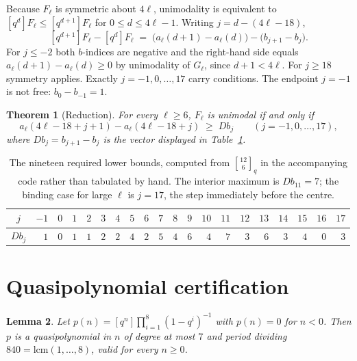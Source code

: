 \documentclass[11pt]{article}
\newtheorem{theorem}{Theorem}
\newtheorem{lemma}[theorem]{Lemma}
\theoremstyle{definition}
\newcommand{\gauss}[2]{\genfrac{[}{]}{0pt}{0}{#1}{#2}_q}
\newcommand{\coeff}[1]{[q^{#1}]}
\begin{document}
Because $F_\ell$ is symmetric about $4\ell$, unimodality is equivalent to
$\coeff{d}F_\ell\le\coeff{d+1}F_\ell$ for $0\le d\le 4\ell-1$. Writing $j=d-(4\ell-18)$,
\[
  \coeff{d+1}F_\ell-\coeff{d}F_\ell
  \;=\;\bigl(a_\ell(d+1)-a_\ell(d)\bigr)-\bigl(b_{j+1}-b_j\bigr).
\]
For $j\le-2$ both $b$-indices are negative and the right-hand side equals
$a_\ell(d+1)-a_\ell(d)\ge0$ by unimodality of $G_\ell$, since $d+1<4\ell$. For $j\ge18$ symmetry
applies. Exactly $j=-1,0,\dots,17$ carry conditions. The endpoint $j=-1$ is not free:
$b_0-b_{-1}=1$.

\begin{theorem}[Reduction]\label{thm:reduction}
For every $\ell\ge6$, $F_\ell$ is unimodal if and only if
\[
  a_\ell(4\ell-18+j+1)-a_\ell(4\ell-18+j)\;\ge\; D b_j
  \qquad (j=-1,0,\dots,17),
\]
where $D b_j=b_{j+1}-b_j$ is the vector displayed in Table~\ref{tab:db}.
\end{theorem}

\begin{table}[h]
\centering
\begin{tabular}{crrrrrrrrrrrrrrrrrrr}
\toprule
$j$ & $-1$&$0$&$1$&$2$&$3$&$4$&$5$&$6$&$7$&$8$&$9$&$10$&$11$&$12$&$13$&$14$&$15$&$16$&$17$\\
\midrule
$Db_j$ & $1$&$0$&$1$&$1$&$2$&$2$&$4$&$2$&$5$&$4$&$6$&$4$&$7$&$3$&$6$&$3$&$4$&$0$&$3$\\
\bottomrule
\end{tabular}
\caption{The nineteen required lower bounds, computed from $\gauss{12}{6}$ in the accompanying
code rather than tabulated by hand. The interior maximum is $Db_{11}=7$; the binding case for large
$\ell$ is $j=17$, the step immediately before the centre.}
\label{tab:db}
\end{table}

\section{Quasipolynomial certification}\label{sec:certificate}

\begin{lemma}\label{lem:quasi}
Let $p(n)=\coeff{n}\prod_{i=1}^{8}(1-q^i)^{-1}$ with $p(n)=0$ for $n<0$. Then $p$ is a
quasipolynomial in $n$ of degree at most $7$ and period dividing $840=\mathrm{lcm}(1,\dots,8)$,
valid for every $n\ge0$.
\end{lemma}
\end{document}
